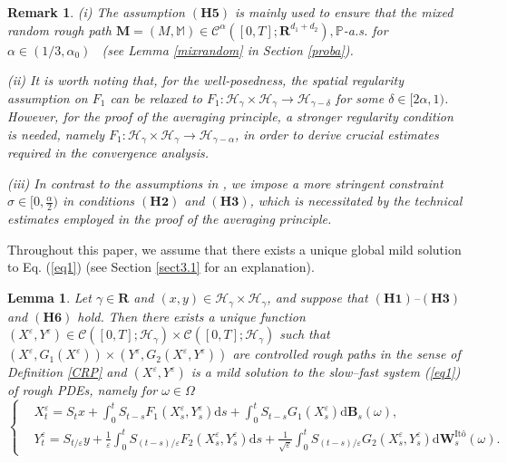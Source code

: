 \documentclass[10pt,a4paper]{article}
\newtheorem{lemma}{Lemma}[section]
\newtheorem{remark}{Remark}[section]
\numberwithin{equation}{section}
\begin{document}
\begin{remark}
(i) The assumption $(\mathbf{H5})$ is mainly used to ensure that the mixed random rough path $\mathbf M=(M, \mathbb M) \in \mathscr{C}^\alpha ([0,T]; \mathbf R^{d_1+d_2}), \mathbb P$-a.s. for $\alpha \in (1/3, \alpha_0)$ ~(see Lemma \ref{mixrandom} in Section \ref{proba}).



(ii) It is worth noting that, for the well-posedness, the spatial regularity assumption on $F_1$ can be relaxed to $F_1:\mathcal{H}_\gamma \times \mathcal{H}_{\gamma}  \to  \mathcal{H}_{\gamma-\delta}$ for some $\delta \in [2\alpha,1)$.
However, for the proof of the averaging principle, a stronger regularity condition is needed, namely $F_1:\mathcal{H}_\gamma \times \mathcal{H}_{\gamma}  \to \mathcal{H}_{\gamma-\alpha}$, in order to derive crucial estimates required in the convergence analysis.


(iii) In contrast to the assumptions in \cite{HN22,YLZ23}, we impose a more stringent constraint $\sigma \in [0, \frac{\alpha}{2})$ in conditions $(\mathbf{H2})$ and $(\mathbf{H3})$, which is necessitated by the technical estimates employed in the proof of the averaging principle.
\end{remark}








Throughout this paper, we assume that there exists a unique global mild solution to Eq. (\ref{eq1}) (see Section \ref{sect3.1} for an explanation).


\begin{lemma}\label{wellpose}
	Let $\gamma \in \mathbf R$ and $(x,y) \in \mathcal H_\gamma \times \mathcal H_\gamma$, and suppose that $(\mathbf{H1})$--$(\mathbf{H3})$ and $(\mathbf{H6})$ hold. Then there exists a unique function $(X^\varepsilon, Y^\varepsilon) \in \mathcal C([0,T]; \mathcal H_\gamma) \times \mathcal C([0,T]; \mathcal H_\gamma)$ such that $\left(X^\varepsilon,G_1(X^\varepsilon) \right) \times \left( Y^\varepsilon,G_2(X^\varepsilon,Y^\varepsilon) \right)$ are controlled rough paths in the sense of Definition \ref{CRP} and $(X^\varepsilon, Y^\varepsilon) $ is a mild solution to the slow--fast system (\ref{eq1}) of rough PDEs, namely for $\omega \in \Omega$
	\begin{equation*}
		\left\{ \begin{aligned}
			&X_t^\varepsilon=S_t x+ \int_0^t S_{t-s} F_1 (X_s^\varepsilon,Y_s^\varepsilon) \mathrm{d}s+ \int_0^t S_{t-s} G_1 (X_s^\varepsilon) \mathrm{d} \mathbf B_s(\omega), \\
			&Y_t^\varepsilon= S_{t/\varepsilon} y+ \frac 1\varepsilon \int_0^t S_{(t-s)/{\varepsilon}} F_2 (X_s^\varepsilon,Y_s^\varepsilon) \mathrm{d} s +\frac 1{\sqrt{\varepsilon}}\int_0^t S_{(t-s)/{\varepsilon}} G_2 (X_s^\varepsilon,Y_s^\varepsilon) \mathrm{d} \mathbf W^{\text{It\^{o}} }_s(\omega).
		\end{aligned}  \right.
	\end{equation*}
	
\end{lemma}
\end{document}
